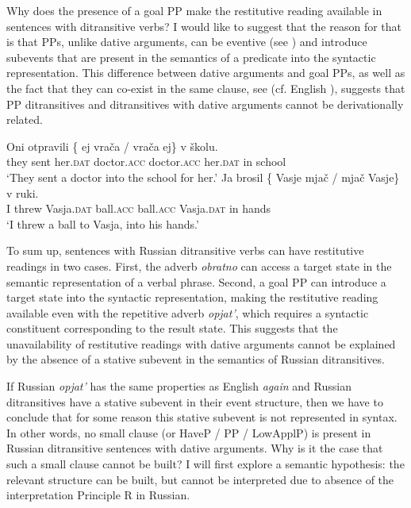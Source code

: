 \documentclass[output=paper]{langscibook}
\begin{document}
Why does the presence of a goal PP make the restitutive reading available in sentences with ditransitive verbs? I would like to suggest that the reason for that is that PPs, unlike dative arguments, can be eventive (see \citealt{McIntyre2006}) and introduce subevents that are present in the semantics of a predicate into the syntactic representation. This difference between dative arguments and goal PPs, as well as the fact that they can co-exist in the same clause, see  (cf. English ), suggests that PP ditransitives and ditransitives with dative arguments cannot be derivationally related.


 \ea\label{ex:bondarenko:25x}\ea\label{ex:bondarenko:25}
\gll Oni otpravili \{\hspace{-2pt} ej vrača / vrača ej\} v školu.\\
     they sent {} her.\textsc{dat} doctor.\textsc{acc} {} doctor.\textsc{acc} her.\textsc{dat} in school\\
\glt `They sent a doctor into the school for her.'
 \ex\label{ex:bondarenko:26}
\gll Ja brosil \{\hspace{-2pt} Vasje mjač / mjač Vasje\} v ruki.\\
     I threw {} Vasja.\textsc{dat} ball.\textsc{acc} {} ball.\textsc{acc} Vasja.\textsc{dat} in hands\\
\glt `I threw a ball to Vasja, into his hands.'
\z\z

 \ea\label{ex:bondarenko:27x}\label{ex:bondarenko:27}
 \label{ex:bondarenko:28}\hfill\citep{McIntyre2011}
\z\z


\noindent To sum up, sentences with Russian ditransitive verbs can have restitutive readings in two cases. First, the adverb \textit{obratno} can access a target state in the semantic representation of a verbal phrase. Second, a goal PP can introduce a target state into the syntactic representation, making the restitutive reading available even with the repetitive adverb \textit{opjat’}, which requires a syntactic constituent corresponding to the result state. This suggests that the unavailability of restitutive readings with dative arguments cannot be explained by the absence of a stative subevent in the semantics of Russian ditransitives.



If Russian \textit{opjat’} has the same properties as English \textit{again} and Russian ditransitives have a stative subevent in their event structure, then we have to conclude that for some reason this stative subevent is not represented in syntax. In other words, no small clause (or HaveP / PP / LowApplP) is present in Russian ditransitive sentences with dative arguments. Why is it the case that such a small clause cannot be built? I will first explore a semantic hypothesis: the relevant structure can be built, but cannot be interpreted due to absence of the interpretation Principle R in Russian.
\end{document}
